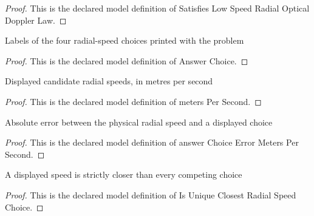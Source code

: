 \begin{proof}
  This is the declared model definition of Satisfies Low Speed Radial Optical Doppler Law.
\end{proof}
\begin{definition}
  \label{def:physics:phyx-mini-0596:phyxminiproblems-problemphyxmini0596-answerchoice}
  Labels of the four radial-speed choices printed with the problem
\end{definition}
\begin{proof}
  This is the declared model definition of Answer Choice.
\end{proof}
\begin{definition}
  \label{def:physics:phyx-mini-0596:phyxminiproblems-problemphyxmini0596-answerchoice-meterspersecond}
  Displayed candidate radial speeds, in metres per second
\end{definition}
\begin{proof}
  This is the declared model definition of meters Per Second.
\end{proof}
\begin{definition}
  \label{def:physics:phyx-mini-0596:phyxminiproblems-problemphyxmini0596-answerchoiceerrormeterspersecond}
  Absolute error between the physical radial speed and a displayed choice
\end{definition}
\begin{proof}
  This is the declared model definition of answer Choice Error Meters Per Second.
\end{proof}
\begin{definition}
  \label{def:physics:phyx-mini-0596:phyxminiproblems-problemphyxmini0596-isuniqueclosestradialspeedchoice}
  A displayed speed is strictly closer than every competing choice
\end{definition}
\begin{proof}
  This is the declared model definition of Is Unique Closest Radial Speed Choice.
\end{proof}
